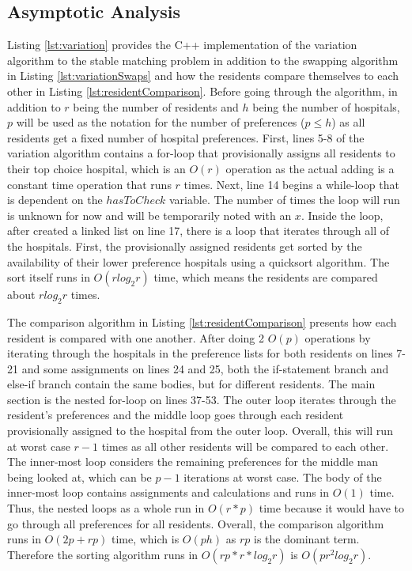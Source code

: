 \documentclass[letterpaper, 10pt,DIV=13]{scrartcl}
\numberwithin{equation}{section} %
\numberwithin{figure}{section} %
\numberwithin{table}{section} %
\begin{document}
\subsection{Asymptotic Analysis}\label{variationAnalysis}
Listing \ref{lst:variation} provides the C++ implementation of the variation algorithm to the stable matching problem in addition to the swapping algorithm in Listing \ref{lst:variationSwaps} and how the residents compare themselves to each other in Listing \ref{lst:residentComparison}. Before going through the algorithm, in addition to $r$ being the number of residents and $h$ being the number of hospitals, $p$ will be used as the notation for the number of preferences ($p \le h$) as all residents get a fixed number of hospital preferences. First, lines 5-8 of the variation algorithm contains a for-loop that provisionally assigns all residents to their top choice hospital, which is an $O(r)$ operation as the actual adding is a constant time operation that runs $r$ times. Next, line 14 begins a while-loop that is dependent on the $hasToCheck$ variable. The number of times the loop will run is unknown for now and will be temporarily noted with an $x$. Inside the loop, after created a linked list on line 17, there is a loop that iterates through all of the hospitals. First, the provisionally assigned residents get sorted by the availability of their lower preference hospitals using a quicksort algorithm. The sort itself runs in $O(rlog_2r)$ time, which means the residents are compared about $rlog_2r$ times.

The comparison algorithm in Listing \ref{lst:residentComparison} presents how each resident is compared with one another. After doing 2 $O(p)$ operations by iterating through the hospitals in the preference lists for both residents on lines 7-21 and some assignments on lines 24 and 25, both the if-statement branch and else-if branch contain the same bodies, but for different residents. The main section is the nested for-loop on lines 37-53. The outer loop iterates through the resident's preferences and the middle loop goes through each resident provisionally assigned to the hospital from the outer loop. Overall, this will run at worst case $r - 1$ times as all other residents will be compared to each other. The inner-most loop considers the remaining preferences for the middle man being looked at, which can be $p - 1$ iterations at worst case. The body of the inner-most loop contains assignments and calculations and runs in $O(1)$ time. Thus, the nested loops as a whole run in $O(r * p)$ time because it would have to go through all preferences for all residents. Overall, the comparison algorithm runs in $O(2p + rp)$ time, which is $O(ph)$ as $rp$ is the dominant term. Therefore the sorting algorithm runs in $O(rp * r * log_2r)$ is $O(pr^2log_2r)$.
\end{document}
